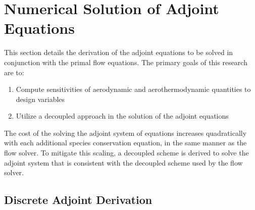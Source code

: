 \chapter{Numerical Solution of Adjoint Equations}
\label{chapter-four}

This section details the derivation of the adjoint equations to be solved in
conjunction with the primal flow equations.  The primary goals of this research
are to:
\begin{enumerate}
  \item Compute sensitivities of aerodynamic and aerothermodynamic quantities to
    design variables
  \item Utilize a decoupled approach in the solution of the adjoint equations
\end{enumerate}
The cost of the solving the adjoint system of equations increases quadratically
with each additional species conservation equation, in the same manner as the
flow solver.  To mitigate this scaling, a decoupled scheme is derived to solve
the adjoint system that is consistent with the decoupled scheme used by the flow
solver.

\section{Discrete Adjoint Derivation}
\label{sec:adj-derivation}

